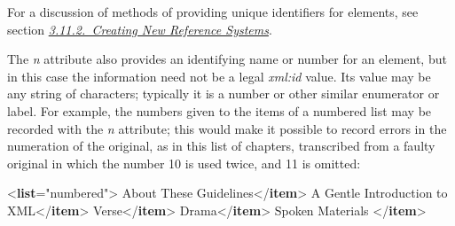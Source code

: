For a discussion of methods of providing unique identifiers for elements, see section \textit{\hyperref[CORS2]{3.11.2.\ Creating New Reference Systems}}.\par
The {\itshape n} attribute also provides an identifying name or number for an element, but in this case the information need not be a legal {\itshape xml:id} value. Its value may be any string of characters; typically it is a number or other similar enumerator or label. For example, the numbers given to the items of a numbered list may be recorded with the {\itshape n} attribute; this would make it possible to record errors in the numeration of the original, as in this list of chapters, transcribed from a faulty original in which the number 10 is used twice, and 11 is omitted: \par\bgroup{}\exampleFont \begin{shaded}\noindent\mbox{}{<\textbf{list}\hspace*{1em}{rend}="{numbered}">}\mbox{}\newline 
{}About These Guidelines{</\textbf{item}>}\mbox{}\newline 
{}A Gentle Introduction to XML{</\textbf{item}>}\mbox{}\newline 
{}Verse{</\textbf{item}>}\mbox{}\newline 
{}Drama{</\textbf{item}>}\mbox{}\newline 
{}Spoken Materials {</\textbf{item}>}\mbox{}\newline 

\end{shaded}
